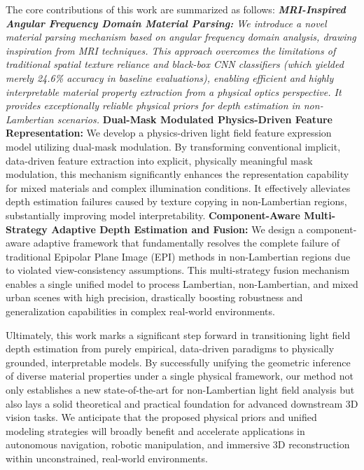 \documentclass[lettersize,journal]{IEEEtran}
\begin{document}
{The core contributions of this work are summarized as follows:
\textit{ \textbf{MRI-Inspired Angular Frequency Domain Material Parsing:} We introduce a novel material parsing mechanism based on angular frequency domain analysis, drawing inspiration from MRI techniques. This approach overcomes the limitations of traditional spatial texture reliance and black-box CNN classifiers (which yielded merely 24.6\% accuracy in baseline evaluations), enabling efficient and highly interpretable material property extraction from a physical optics perspective. It provides exceptionally reliable physical priors for depth estimation in non-Lambertian scenarios.
} \textbf{Dual-Mask Modulated Physics-Driven Feature Representation:} We develop a physics-driven light field feature expression model utilizing dual-mask modulation. By transforming conventional implicit, data-driven feature extraction into explicit, physically meaningful mask modulation, this mechanism significantly enhances the representation capability for mixed materials and complex illumination conditions. It effectively alleviates depth estimation failures caused by texture copying in non-Lambertian regions, substantially improving model interpretability.
\textbf{Component-Aware Multi-Strategy Adaptive Depth Estimation and Fusion:} We design a component-aware adaptive framework that fundamentally resolves the complete failure of traditional Epipolar Plane Image (EPI) methods in non-Lambertian regions due to violated view-consistency assumptions. This multi-strategy fusion mechanism enables a single unified model to process Lambertian, non-Lambertian, and mixed urban scenes with high precision, drastically boosting robustness and generalization capabilities in complex real-world environments.

Ultimately, this work marks a significant step forward in transitioning light field depth estimation from purely empirical, data-driven paradigms to physically grounded, interpretable models. By successfully unifying the geometric inference of diverse material properties under a single physical framework, our method not only establishes a new state-of-the-art for non-Lambertian light field analysis but also lays a solid theoretical and practical foundation for advanced downstream 3D vision tasks. We anticipate that the proposed physical priors and unified modeling strategies will broadly benefit and accelerate applications in autonomous navigation, robotic manipulation, and immersive 3D reconstruction within unconstrained, real-world environments.


}
\end{document}
